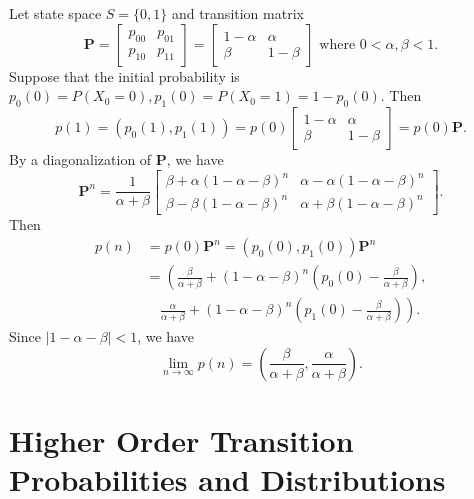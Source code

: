 \begin{example}
  Let state space \(S = \{0, 1\}\) and transition matrix
  \[
    \mathbf{P} = \begin{bmatrix}
      p_{00} & p_{01} \\
      p_{10} & p_{11}
    \end{bmatrix} = \begin{bmatrix}
      1 - \alpha & \alpha \\
      \beta & 1 - \beta
    \end{bmatrix}
    \text{ where } 0 < \alpha, \beta < 1.
  \]
  Suppose that the initial probability is \(p_0(0) = P(X_0 = 0), p_1(0) = P(X_0 = 1) = 1 - p_0(0)\). Then
  \[
    p(1) =(p_0(1), p_1(1)) = p(0) \begin{bmatrix}
      1 - \alpha & \alpha \\
      \beta & 1 - \beta
    \end{bmatrix} = p(0) \mathbf{P}.
  \]
  By a diagonalization of \(\mathbf{P}\), we have
  \[
    \mathbf{P}^n = \frac{1}{\alpha + \beta}
    \begin{bmatrix}
      \beta + \alpha (1 - \alpha - \beta)^n & \alpha - \alpha (1 - \alpha - \beta)^n \\
      \beta - \beta (1 - \alpha - \beta)^n & \alpha + \beta (1 - \alpha - \beta)^n
    \end{bmatrix}.
  \]
  Then
  \begin{align*}
    p(n) &= p(0) \mathbf{P}^n = (p_0(0), p_1(0)) \mathbf{P}^n \\
    &= \left(\frac{\beta}{\alpha + \beta} + (1 - \alpha - \beta)^n \left(p_0(0) - \frac{\beta}{\alpha + \beta}\right)\right., \\
    &\quad \left.\frac{\alpha}{\alpha + \beta} + (1 - \alpha - \beta)^n \left(p_1(0) - \frac{\beta}{\alpha + \beta}\right)\right).
  \end{align*}
  Since \(|1 - \alpha - \beta| < 1\), we have
  \[
    \lim_{n \to \infty} p(n) = \left(\frac{\beta}{\alpha + \beta}, \frac{\alpha}{\alpha + \beta}\right).
  \]
\end{example}

\section{Higher Order Transition Probabilities and Distributions}

